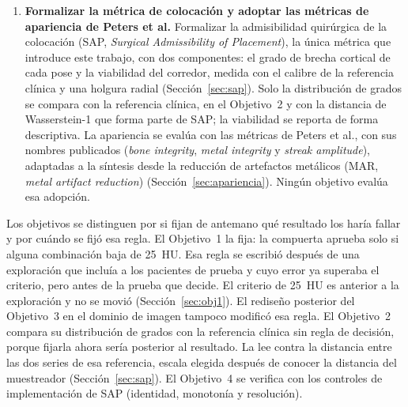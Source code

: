 \begin{enumerate}
    \item \textbf{Formalizar la métrica de colocación y adoptar las métricas de apariencia de Peters et al.} Formalizar la admisibilidad quirúrgica de la colocación (SAP, \emph{Surgical Admissibility of Placement}), la única métrica que introduce este trabajo, con dos componentes: el grado de brecha cortical de cada pose y la viabilidad del corredor, medida con el calibre de la referencia clínica y una holgura radial (Sección~\ref{sec:sap}). Solo la distribución de grados se compara con la referencia clínica, en el Objetivo~2 y con la distancia de Wasserstein-1 que forma parte de SAP; la viabilidad se reporta de forma descriptiva. La apariencia se evalúa con las métricas de Peters et al., con sus nombres publicados (\emph{bone integrity}, \emph{metal integrity} y \emph{streak amplitude}), adaptadas a la síntesis desde la reducción de artefactos metálicos (MAR, \emph{metal artifact reduction}) (Sección~\ref{sec:apariencia}). Ningún objetivo evalúa esa adopción.
\end{enumerate}

Los objetivos se distinguen por si fijan de antemano qué resultado los haría fallar y por cuándo se fijó esa regla. El Objetivo~1 la fija: la compuerta aprueba solo si alguna combinación baja de 25~HU. Esa regla se escribió después de una exploración que incluía a los pacientes de prueba y cuyo error ya superaba el criterio, pero antes de la prueba que decide. El criterio de 25~HU es anterior a la exploración y no se movió (Sección~\ref{sec:obj1}). El rediseño posterior del Objetivo~3 en el dominio de imagen tampoco modificó esa regla. El Objetivo~2 compara su distribución de grados con la referencia clínica sin regla de decisión, porque fijarla ahora sería posterior al resultado. La lee contra la distancia entre las dos series de esa referencia, escala elegida después de conocer la distancia del muestreador (Sección~\ref{sec:sap}). El Objetivo~4 se verifica con los controles de implementación de SAP (identidad, monotonía y resolución).

